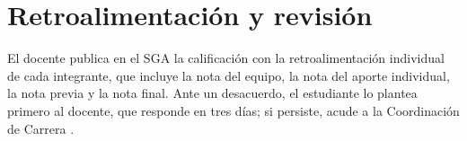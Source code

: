 \documentclass[11pt,a4paper]{article}
\begin{document}
\section{Retroalimentación y revisión}

El docente publica en el SGA la calificación con la retroalimentación individual de cada integrante, que incluye la nota del equipo, la nota del aporte individual, la nota previa y la nota final. Ante un desacuerdo, el estudiante lo plantea primero al docente, que responde en tres días; si persiste, acude a la Coordinación de Carrera \cite{uteq2021reglamento}.

\printbibliography[heading=bibintoc,title={Referencias}]
\end{document}
